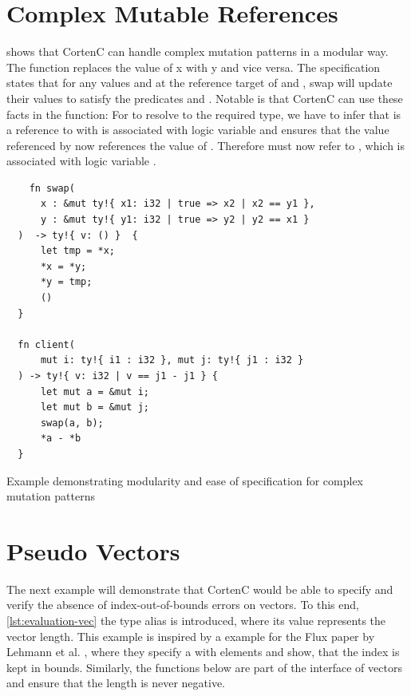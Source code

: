 \documentclass[twoside, english]{sdqthesis}
\theoremstyle{definition}
\begin{document}
\label{subsec:evaluation-complex-mutable-ref}\section{Complex Mutable References}

 shows that CortenC can handle complex mutation patterns in a modular way. 
The  function replaces the value of x with y and vice versa. The specification states that for any values  and  at the reference target of  and , swap will update their values to satisfy the predicates  and .
Notable is that CortenC can use these facts in the  function: For  to resolve to the required type, we have to infer that  is a reference to  with is associated with logic variable  and  ensures that the value referenced by  now references the value of . Therefore  must now refer to , which is associated with logic variable .

\begin{listing}[ht]
  \begin{verbatim}
    fn swap(
      x : &mut ty!{ x1: i32 | true => x2 | x2 == y1 },
      y : &mut ty!{ y1: i32 | true => y2 | y2 == x1 }
  )  -> ty!{ v: () }  {
      let tmp = *x;
      *x = *y;
      *y = tmp;
      ()
  }

  fn client(
      mut i: ty!{ i1 : i32 }, mut j: ty!{ j1 : i32 }
  ) -> ty!{ v: i32 | v == j1 - j1 } {
      let mut a = &mut i;
      let mut b = &mut j;
      swap(a, b);
      *a - *b
  }
  \end{verbatim}
  \caption{Example demonstrating modularity and ease of specification for complex mutation patterns}
  \label{lst:evaluation-swap}
\end{listing}

\section{Pseudo Vectors}

The next example will demonstrate that CortenC would be able to specify and verify the absence of index-out-of-bounds errors on vectors. To this end, \cref{lst:evaluation-vec} the type alias  is introduced, where its value represents the vector length. This example is inspired by a example for the Flux paper by Lehmann et al. \cite{lehmann_flux_2022}, where they specify a  with elements and show, that the index is kept in bounds.
Similarly, the functions below are part of the interface of vectors and ensure that the length is never negative. 
\end{document}
